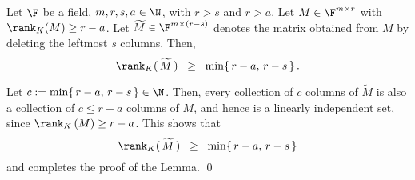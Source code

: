 \begin{lemma}\label{LemmaKruskalRankOfDeletionMatrix}
\mbox{}\vskip 0.05cm
\noindent
Let $\F$ be a field, $m, r, s, a \in \N$, with $r > s$ and $r > a$.
Let $M \in \F^{m \times r}$ with $\rank_{K}\!\left(M\right) \geq r - a$.
Let $\widetilde{M} \in \F^{m \times (r-s)}$ denotes the matrix
obtained from $M$ by deleting the leftmost $s$ columns.
Then,
\begin{equation*}
\rank_{K}(\,\widetilde{M}\,)
\;\; \geq \;\; \min\!\left\{\,r-a,\,r-s\,\right\}.
\end{equation*}
\end{lemma}
\proof
Let $c := \min\!\left\{\,r-a,\,r-s\,\right\} \in \N$.
Then, every collection of $c$ columns of $\widetilde{M}$ is also
a collection of $c \leq r-a$ columns of $M$, and hence is a linearly independent set,
since $\rank_{K}\left(M\right) \geq r - a$. This shows that
$$\rank_{K}(\,\widetilde{M}\,) \;\; \geq \;\; \min\!\left\{\,r-a,\,r-s\,\right\}$$
and completes the proof of the Lemma.
\qed


